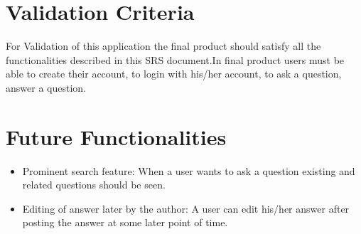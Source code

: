 \documentclass[12pt]{article}
\begin{document}
\section{Validation Criteria}
For Validation of this application the final product should satisfy all the functionalities described in this SRS document.In final product users must be able to create their account, to login with his/her account, to ask a question, answer a question.

\section{Future Functionalities}
\begin{itemize}
\item Prominent search feature: When a user wants to ask a question existing and related questions should be seen.
\item Editing of answer later by the author: A user can edit his/her answer after posting the answer at some later point of time.
\end{itemize}
\end{document}
